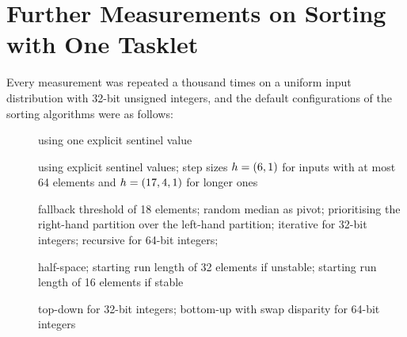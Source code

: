 \chapter{Further Measurements on Sorting with One Tasklet}
\label{apx:tasklet}

Every measurement was repeated a thousand times on a uniform input distribution with 32-bit unsigned integers, and the default configurations of the sorting algorithms were as follows:
\begin{description}
	\item[\IS{}]
	using one explicit sentinel value

	\item[\ShS{}]
	using explicit sentinel values;
	step sizes \(h = (6, 1)\) for inputs with at most 64 elements and \(h = (17, 4, 1)\) for longer ones

	\item[\QS{}]
	fallback threshold of 18 elements;
	random median as pivot;
	prioritising the right-hand partition over the left-hand partition;
	iterative for 32-bit integers;
	recursive for 64-bit integers;

	\item[\MS{}]
	half-space;
	starting run length of 32 elements if unstable;
	starting run length of 16 elements if stable

	\item[\HS{}]
	top-down for 32-bit integers;
	bottom-up with swap disparity for 64-bit integers
\end{description}

\clearpage


\clearpage


\clearpage


\clearpage


\clearpage

